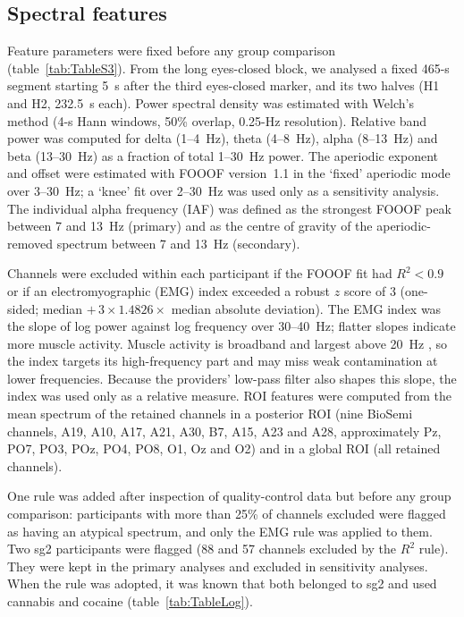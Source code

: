 \subsection{Spectral features}
\label{sec:features}

Feature parameters were fixed before any group comparison (table~\ref{tab:TableS3}). From the long eyes-closed block, we analysed a fixed 465-s segment starting 5~s after the third eyes-closed marker, and its two halves (H1 and H2, 232.5~s each). Power spectral density was estimated with Welch's method (4-s Hann windows, 50\% overlap, 0.25-Hz resolution). Relative band power was computed for delta (1--4~Hz), theta (4--8~Hz), alpha (8--13~Hz) and beta (13--30~Hz) as a fraction of total 1--30~Hz power. The aperiodic exponent and offset were estimated with FOOOF version~1.1 \cite{Donoghue2020} in the `fixed' aperiodic mode over 3--30~Hz; a `knee' fit over 2--30~Hz was used only as a sensitivity analysis. The individual alpha frequency (IAF) was defined as the strongest FOOOF peak between 7 and 13~Hz (primary) and as the centre of gravity of the aperiodic-removed spectrum between 7 and 13~Hz (secondary).

Channels were excluded within each participant if the FOOOF fit had $R^2 < 0.9$ or if an electromyographic (EMG) index exceeded a robust $z$ score of 3 (one-sided; median $+\,3 \times 1.4826 \times$ median absolute deviation). The EMG index was the slope of log power against log frequency over 30--40~Hz; flatter slopes indicate more muscle activity. Muscle activity is broadband and largest above 20~Hz \cite{Goncharova2003}, so the index targets its high-frequency part and may miss weak contamination at lower frequencies. Because the providers' low-pass filter also shapes this slope, the index was used only as a relative measure. ROI features were computed from the mean spectrum of the retained channels in a posterior ROI (nine BioSemi channels, A19, A10, A17, A21, A30, B7, A15, A23 and A28, approximately Pz, PO7, PO3, POz, PO4, PO8, O1, Oz and O2) and in a global ROI (all retained channels).

One rule was added after inspection of quality-control data but before any group comparison: participants with more than 25\% of channels excluded were flagged as having an atypical spectrum, and only the EMG rule was applied to them. Two sg2 participants were flagged (88 and 57 channels excluded by the $R^2$ rule). They were kept in the primary analyses and excluded in sensitivity analyses. When the rule was adopted, it was known that both belonged to sg2 and used cannabis and cocaine (table~\ref{tab:TableLog}).

